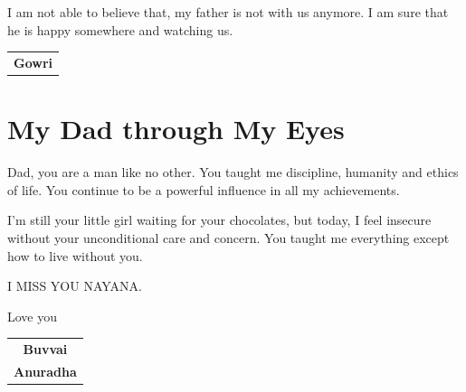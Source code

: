 I am not able to believe that, my father is not with us anymore. I am sure that he is happy somewhere and watching us.
\bigskip

\begin{flushright}
\begin{tabular}{c}
\textbf{Gowri}
\end{tabular}
\end{flushright}
\bigskip

\section*{My Dad through My Eyes}

Dad, you are a man like no other. You taught me discipline, humanity and ethics of life. You continue to be a powerful influence in all my achievements.

I’m still your little girl waiting for your chocolates, but today, I feel insecure without your unconditional care and concern. You taught me everything except how to live without you.
\bigskip

\noindent I MISS YOU NAYANA.

\noindent Love you

\begin{flushright}
\begin{tabular}{c}
\textbf{Buvvai}\\
\textbf{Anuradha}
\end{tabular}
\end{flushright}

\newpage

